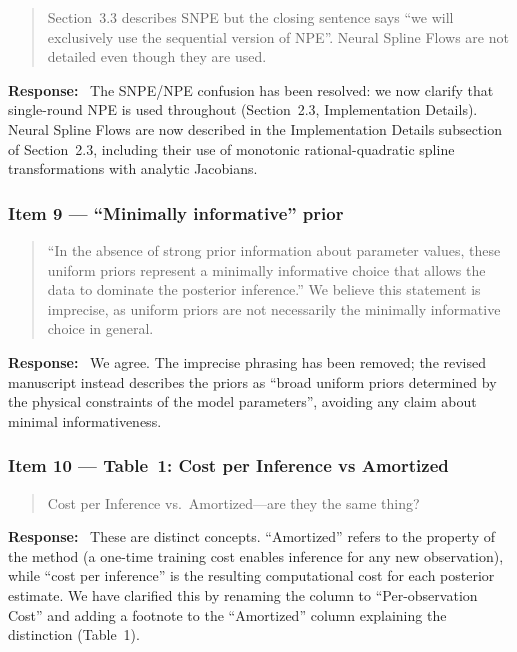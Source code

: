 \documentclass[11pt,a4paper]{article}
\newenvironment{reviewercomment}{%
  \begin{quote}\itshape\color{reviewerblue}%
}{%
  \end{quote}%
}
\newcommand{\response}{\textbf{Response:}~}
\begin{document}
\begin{reviewercomment}
Section~3.3 describes SNPE but the closing sentence says ``we will exclusively use the sequential version of NPE''. Neural Spline Flows are not detailed even though they are used.
\end{reviewercomment}

\response
The SNPE/NPE confusion has been resolved: we now clarify that single-round NPE is used throughout (Section~2.3, Implementation Details). Neural Spline Flows are now described in the Implementation Details subsection of Section~2.3, including their use of monotonic rational-quadratic spline transformations with analytic Jacobians.


\subsubsection*{Item 9 --- ``Minimally informative'' prior}

\begin{reviewercomment}
``In the absence of strong prior information about parameter values, these uniform priors represent a minimally informative choice that allows the data to dominate the posterior inference.'' We believe this statement is imprecise, as uniform priors are not necessarily the minimally informative choice in general.
\end{reviewercomment}

\response
We agree. The imprecise phrasing has been removed; the revised manuscript instead describes the priors as ``broad uniform priors determined by the physical constraints of the model parameters'', avoiding any claim about minimal informativeness.


\subsubsection*{Item 10 --- Table~1: Cost per Inference vs Amortized}

\begin{reviewercomment}
Cost per Inference vs.\ Amortized---are they the same thing?
\end{reviewercomment}

\response
These are distinct concepts. ``Amortized'' refers to the property of the method (a one-time training cost enables inference for any new observation), while ``cost per inference'' is the resulting computational cost for each posterior estimate. We have clarified this by renaming the column to ``Per-observation Cost'' and adding a footnote to the ``Amortized'' column explaining the distinction (Table~1).
\end{document}
